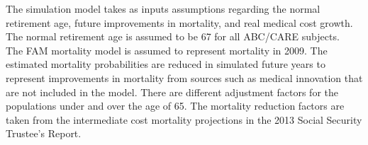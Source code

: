 \noindent The simulation model takes as inputs assumptions regarding the normal retirement age, future improvements in mortality, and real medical cost growth.
The normal retirement age is assumed to be 67 for all ABC/CARE subjects. \\


\noindent The FAM mortality model is assumed to represent mortality in 2009.
The estimated mortality probabilities are reduced in simulated future years to represent improvements in mortality from sources such as medical innovation that are not included in the model.
There are different adjustment factors for the populations under and over the age of 65.
The mortality reduction factors are taken from the intermediate cost mortality projections in the 2013 Social Security Trustee's Report. \\


